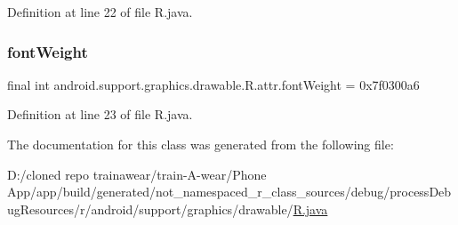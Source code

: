 Definition at line 22 of file R.\+java.

\mbox{\label{classandroid_1_1support_1_1graphics_1_1drawable_1_1_r_1_1attr_ae2c7f9b69aeb5af599fc6de1ba4fbf7c}} 
\subsubsection{\texorpdfstring{fontWeight}{fontWeight}}
{\footnotesize\ttfamily final int android.\+support.\+graphics.\+drawable.\+R.\+attr.\+font\+Weight = 0x7f0300a6\hspace{0.3cm}{\ttfamily [static]}}



Definition at line 23 of file R.\+java.



The documentation for this class was generated from the following file\+:\begin{DoxyCompactItemize}
\item 
D\+:/cloned repo trainawear/train-\/\+A-\/wear/\+Phone App/app/build/generated/not\+\_\+namespaced\+\_\+r\+\_\+class\+\_\+sources/debug/process\+Debug\+Resources/r/android/support/graphics/drawable/\mbox{\hyperlink{process_debug_resources_2r_2android_2support_2graphics_2drawable_2_r_8java}{R.\+java}}\end{DoxyCompactItemize}
